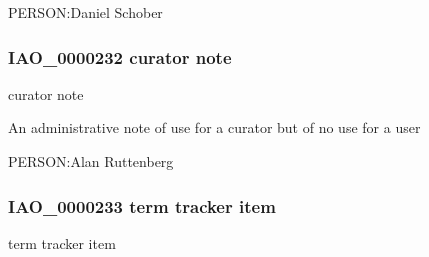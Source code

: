\documentclass[letterpaper,10pt,english]{sphinxmanual}
\begin{document}
\begin{sphinxShadowBox}

\sphinxAtStartPar
PERSON:Daniel Schober
\end{sphinxShadowBox}
\begin{quote}

\ignorespaces \end{quote}


\subsubsection{IAO\_0000232 \sphinxhyphen{} curator note}
\label{\detokenize{doc-IAO_0000232:iao-0000232-curator-note}}\label{\detokenize{doc-IAO_0000232:index-0}}\label{\detokenize{doc-IAO_0000232::doc}}
\begin{sphinxShadowBox}

\sphinxAtStartPar
curator note
\end{sphinxShadowBox}

\begin{sphinxShadowBox}

\sphinxAtStartPar
An administrative note of use for a curator but of no use for a user
\end{sphinxShadowBox}

\begin{sphinxShadowBox}

\sphinxAtStartPar
PERSON:Alan Ruttenberg
\end{sphinxShadowBox}
\begin{quote}

\ignorespaces \end{quote}


\subsubsection{IAO\_0000233 \sphinxhyphen{} term tracker item}
\label{\detokenize{doc-IAO_0000233:iao-0000233-term-tracker-item}}\label{\detokenize{doc-IAO_0000233:index-0}}\label{\detokenize{doc-IAO_0000233::doc}}
\begin{sphinxShadowBox}

\sphinxAtStartPar
term tracker item
\end{sphinxShadowBox}
\end{document}
